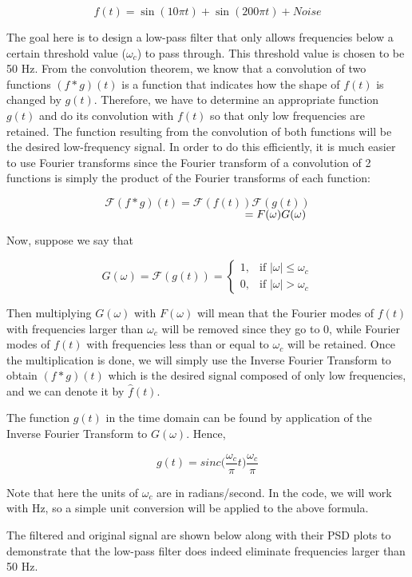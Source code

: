 \documentclass[11pt,a4paper]{article}
\begin{document}
\begin{flushleft}
\begin{flushleft}
\begin{flushleft}
$$ f(t) = \sin(10\pi t)+\sin(200 \pi t) + Noise $$

\bigskip The goal here is to design a low-pass filter that only allows frequencies below a certain threshold value ($\omega_c$) to pass through. This threshold value is chosen to be 50 Hz. From the convolution theorem, we know that a convolution of two functions $(f * g)(t)$ is a function that indicates how the shape of $f(t)$ is changed by $g(t)$. Therefore, we have to determine an appropriate function $g(t)$ and do its convolution with $f(t)$ so that only low frequencies are retained. The function resulting from the convolution of both functions will be the desired low-frequency signal. In order to do this efficiently, it is much easier to use Fourier transforms since the Fourier transform of a convolution of 2 functions is simply the product of the Fourier transforms of each function:

$$ \mathcal{F}(f *g)(t) = \mathcal{F}(f(t)) \mathcal{F}(g(t))$$
$\hspace{7.5cm} = F(\omega)G(\omega)$ 

\bigskip Now, suppose we say that 

$$ G(\omega) = \mathcal{F}(g(t)) = \begin{cases}
     1,             & \text{if } |\omega|\leq \omega_c\\
     0,              & \text{if } |\omega| > \omega_c
\end{cases}$$

\bigskip Then multiplying $G(\omega)$ with $F(\omega)$ will mean that the Fourier modes of $f(t)$ with frequencies larger than $\omega_c$ will be removed since they go to 0, while Fourier modes of $f(t)$ with frequencies less than or equal to $\omega_c$ will be retained. Once the multiplication is done, we will simply use the Inverse Fourier Transform to obtain $(f *g)(t)$ which is the desired  signal composed of only low frequencies, and we can denote it by $\hat{f}(t)$.

\bigskip The function $g(t)$ in the time domain can be found by application of the Inverse Fourier Transform to $G(\omega)$. Hence, 

$$g(t) = sinc\Big(\frac{\omega_c}{\pi}t\Big)\frac{\omega_c}{\pi}$$

\bigskip Note that here the units of $\omega_c$ are in radians/second. In the code, we will work with Hz, so a simple unit conversion will be applied to the above formula.

\bigskip The filtered and original signal are shown below along with their PSD plots to demonstrate that the low-pass filter does indeed eliminate frequencies larger than 50 Hz.


\end{flushleft}
\end{flushleft}
\end{flushleft}
\end{document}
